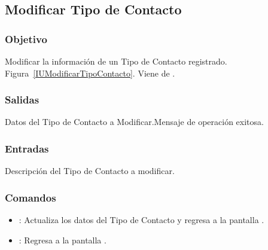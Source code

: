 \subsection{Modificar Tipo de Contacto}
\subsubsection{Objetivo}
Modificar la información de un Tipo de Contacto registrado. Figura~\ref{IUModificarTipoContacto}. Viene de .




\subsubsection{Salidas}
Datos del Tipo de Contacto a Modificar.Mensaje de operación exitosa.

\subsubsection{Entradas}
Descripción del Tipo de Contacto a modificar.



\subsubsection{Comandos}
\begin{itemize}
 \item {}: Actualiza los datos del Tipo de Contacto y regresa a la pantalla .
 \item {}: Regresa a la pantalla .
\end{itemize}


